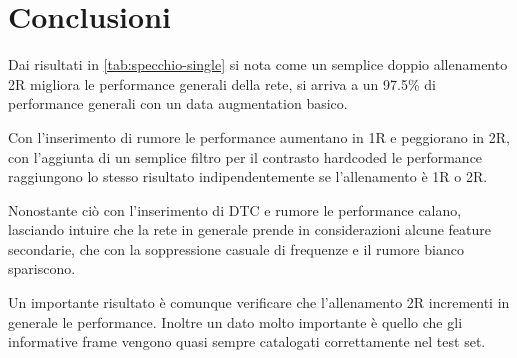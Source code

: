 \chapter{Conclusioni}\label{conclusioni}

Dai risultati in \cref{tab:specchio-single} si  nota come un semplice doppio allenamento 2R migliora le performance generali della rete, si arriva a un 97.5\% di performance generali con un data augmentation basico. 

Con l'inserimento di rumore le performance aumentano in 1R e peggiorano in 2R, con l'aggiunta di un semplice filtro per il contrasto hardcoded le performance raggiungono lo stesso risultato indipendentemente se l'allenamento è 1R o 2R.

Nonostante ciò con l'inserimento di DTC e rumore le performance calano, lasciando intuire che la rete in generale prende in considerazioni alcune feature secondarie, che con la soppressione casuale di frequenze e il rumore bianco spariscono.

Un importante risultato è comunque verificare che l'allenamento 2R incrementi in generale le performance. Inoltre un dato molto importante è  quello che gli informative frame vengono quasi sempre catalogati correttamente nel test set.